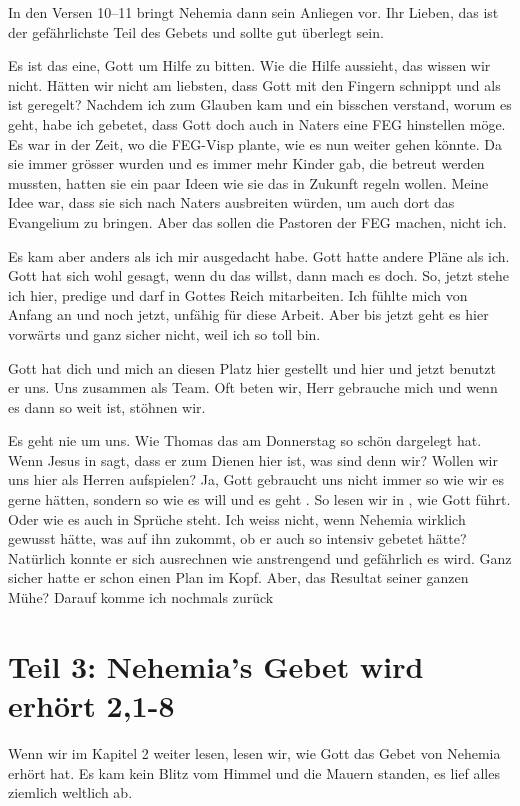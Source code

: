 \documentclass[fontsize=16pt]{mybib}
\begin{document}

In den Versen 10--11 bringt Nehemia dann sein Anliegen vor. Ihr Lieben, das ist der gefährlichste Teil des Gebets und sollte gut überlegt sein.

Es ist das eine, Gott um Hilfe zu bitten. Wie die Hilfe aussieht, das wissen wir nicht. Hätten wir nicht am liebsten, dass Gott mit den Fingern schnippt und als ist geregelt? Nachdem ich zum Glauben kam und ein bisschen verstand, worum es geht, habe ich gebetet, dass Gott doch auch in Naters eine FEG hinstellen möge. Es war in der Zeit, wo die FEG-Visp plante, wie es nun weiter gehen könnte. Da sie immer grösser wurden und es immer mehr Kinder gab, die betreut werden mussten, hatten sie ein paar Ideen wie sie das in Zukunft regeln wollen. Meine Idee war, dass sie sich nach Naters ausbreiten würden, um auch dort das Evangelium zu bringen. Aber das sollen die Pastoren der FEG machen, nicht ich.

Es kam aber anders als ich mir ausgedacht habe. Gott hatte andere Pläne als ich. Gott hat sich wohl gesagt, wenn du das willst, dann mach es doch. So, jetzt stehe ich hier, predige und darf in Gottes Reich mitarbeiten. Ich fühlte mich von Anfang an und noch jetzt, unfähig für diese Arbeit. Aber bis jetzt geht es hier vorwärts und ganz sicher nicht, weil ich so toll bin. 

Gott hat dich und mich an diesen Platz hier gestellt und hier und jetzt benutzt er uns. Uns zusammen als Team. Oft beten wir, Herr gebrauche mich und wenn es dann so weit ist, stöhnen wir. 

Es geht nie um uns. Wie Thomas das am Donnerstag so schön dargelegt hat. Wenn Jesus in  sagt, dass er zum Dienen hier ist, was sind denn wir? Wollen wir uns hier als Herren aufspielen? Ja, Gott gebraucht uns nicht immer so wie wir es gerne hätten, sondern so wie  es will und es geht . So lesen wir in , wie Gott führt. Oder wie es auch in Sprüche  steht. Ich weiss nicht, wenn Nehemia wirklich gewusst hätte, was auf ihn zukommt, ob er auch so intensiv gebetet hätte? Natürlich konnte er sich ausrechnen wie anstrengend und gefährlich es wird. Ganz sicher hatte er schon einen Plan im Kopf. Aber, das Resultat seiner ganzen Mühe? Darauf komme ich nochmals zurück

\section{Teil 3: Nehemia's Gebet wird erhört 2,1-8}
Wenn wir im Kapitel 2 weiter lesen, lesen wir, wie Gott das Gebet von Nehemia erhört hat. Es kam kein Blitz vom Himmel und die Mauern standen, es lief alles ziemlich weltlich ab.
\end{document}
